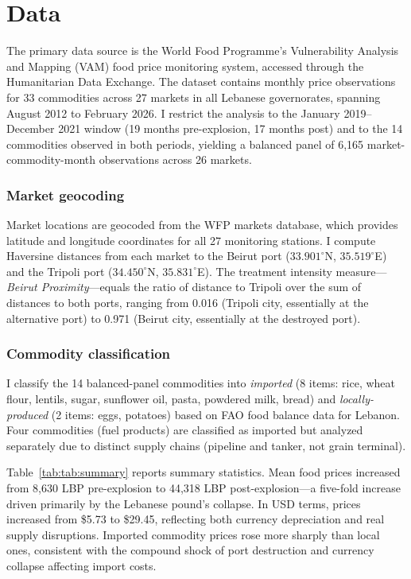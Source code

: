 \documentclass[12pt]{article}
\begin{document}
\section{Data}\label{sec:data}

The primary data source is the World Food Programme's Vulnerability Analysis and Mapping (VAM) food price monitoring system, accessed through the Humanitarian Data Exchange. The dataset contains monthly price observations for 33 commodities across 27 markets in all Lebanese governorates, spanning August 2012 to February 2026. I restrict the analysis to the January 2019--December 2021 window (19 months pre-explosion, 17 months post) and to the 14 commodities observed in both periods, yielding a balanced panel of 6,165 market-commodity-month observations across 26 markets.

\subsubsection*{Market geocoding} Market locations are geocoded from the WFP markets database, which provides latitude and longitude coordinates for all 27 monitoring stations. I compute Haversine distances from each market to the Beirut port ($33.901^{\circ}$N, $35.519^{\circ}$E) and the Tripoli port ($34.450^{\circ}$N, $35.831^{\circ}$E). The treatment intensity measure---\textit{Beirut Proximity}---equals the ratio of distance to Tripoli over the sum of distances to both ports, ranging from 0.016 (Tripoli city, essentially at the alternative port) to 0.971 (Beirut city, essentially at the destroyed port).

\subsubsection*{Commodity classification} I classify the 14 balanced-panel commodities into \textit{imported} (8 items: rice, wheat flour, lentils, sugar, sunflower oil, pasta, powdered milk, bread) and \textit{locally-produced} (2 items: eggs, potatoes) based on FAO food balance data for Lebanon. Four commodities (fuel products) are classified as imported but analyzed separately due to distinct supply chains (pipeline and tanker, not grain terminal).

Table~\ref{tab:tab:summary} reports summary statistics. Mean food prices increased from 8,630 LBP pre-explosion to 44,318 LBP post-explosion---a five-fold increase driven primarily by the Lebanese pound's collapse. In USD terms, prices increased from \$5.73 to \$29.45, reflecting both currency depreciation and real supply disruptions. Imported commodity prices rose more sharply than local ones, consistent with the compound shock of port destruction and currency collapse affecting import costs.
\end{document}
